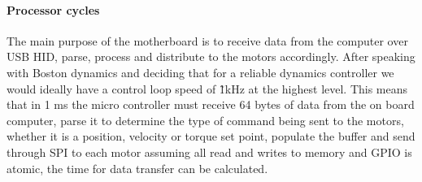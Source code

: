    		\paragraph{Processor cycles}
   			The main purpose of the motherboard is to receive data from the computer over USB HID, parse, process and distribute to the motors accordingly. After speaking with Boston dynamics and deciding that for a reliable dynamics controller we would ideally have a control loop speed of \~ 1kHz at the highest level. This means that in 1 ms the micro controller must receive 64 bytes of data from the on board computer, parse it to determine the type of command being sent to the motors, whether it is a position, velocity or torque set point, populate the buffer and send through SPI to each motor assuming all read and writes to memory and GPIO is atomic, the time for data transfer can be calculated. \newline
